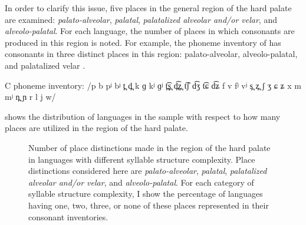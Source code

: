   In order to clarify this issue, five places in the general region of the hard palate are examined: \textit{palato-alveolar}, \textit{palatal}, \textit{palatalized alveolar and/or velar}, and \textit{alveolo-palatal}. For each language, the number of places in which consonants are produced in this region is noted. For example, the phoneme inventory of  has consonants in three distinct places in this region: palato-alveolar, alveolo-palatal, and palatalized velar .

\ea\label{ex:4.32}
\begin{Coding}
\item[C phoneme inventory:] /p b pʲ bʲ t̪ d̪ k ɡ kʲ ɡʲ t̪͡s̪ d̪͡z̪ t͡ʃ d͡ʒ t͡ɕ d͡ʑ f v fʲ vʲ s̪ z̪ ʃ ʒ ɕ ʑ x m mʲ n̪ ɲ r l j w/
\end{Coding}
\z

   shows the distribution of languages in the sample with respect to how many places are utilized in the region of the hard palate.

\begin{figure}
\caption{\label{fig:4.10} Number of place distinctions made in the region of the hard palate in languages with different syllable structure complexity. Place distinctions considered here are \textit{palato-alveolar}, \textit{palatal}, \textit{palatalized alveolar and/or velar}, and \textit{alveolo-palatal}. For each category of syllable structure complexity, I show the percentage of languages having one, two, three, or none of these places represented in their consonant inventories.}
\end{figure}

